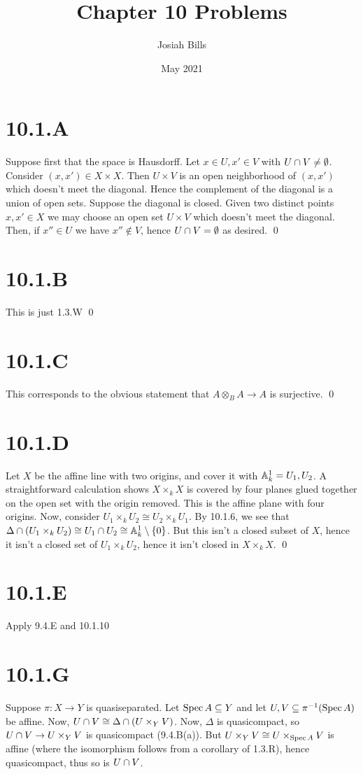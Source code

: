 \documentclass{article}
\title{Chapter 10 Problems}
\author{Josiah Bills}
\date{May 2021}
\begin{document}
\maketitle

\section{10.1.A}
Suppose first that the space is Hausdorff. Let $x \in U, x' \in V$ with
$U \cap V \neq \emptyset$. Consider $(x, x') \in X \times X$. Then
$U \times V$ is an open neighborhood of $(x, x')$ which
doesn't meet the diagonal. Hence the complement of the diagonal is a union of
open sets. Suppose the diagonal is closed. Given two distinct points
$x, x' \in X$ we may choose an open set $U \times V$ which
doesn't meet the diagonal. Then, if $x'' \in U$ we have
$x'' \notin V$, hence $U \cap V = \emptyset$ as desired. \qed

\section{10.1.B}
This is just 1.3.W \qed

\section{10.1.C}
This corresponds to the obvious statement that $A \otimes_B A \to A$ is
surjective. \qed

\section{10.1.D}
Let $X$ be the affine line with two origins, and cover it
with $\mathbb{A}^1_k=U_1, U_2$. A straightforward calculation shows
$X \times_k X$ is covered by four planes glued together on the open set
with the origin removed. This is the affine plane with four origins. Now,
consider $U_1 \times_k U_2 \cong U_2 \times_k U_1$. By 10.1.6, we see that $\Delta \cap (U_1 \times_k U_2) \cong U_1 \cap U_2 \cong \mathbb{A}^1_k \setminus
    \{0\}$.
But this isn't a closed subset of $X$, hence it isn't a
closed set of $U_1 \times_k U_2$, hence it isn't closed in
$X \times_k X$. \qed

\section{10.1.E}
Apply 9.4.E and 10.1.10

\section{10.1.G}
Suppose $\pi: X \to Y$ is quasiseparated. Let $\operatorname{Spec} A \subseteq Y$
and let $U, V \subseteq \pi^{-1}(\operatorname{Spec} A)$ be affine. Now, $U \cap V \cong \Delta \cap (U \times_Y V)$. Now,
$\Delta$ is quasicompact, so $U \cap V \to U \times_Y V$ is
quasicompact (9.4.B(a)). But $U \times_Y V \cong U \times_{\operatorname{Spec} A} V$ is affine (where the
isomorphism follows from a corollary of 1.3.R), hence quasicompact, thus so is
$U \cap V$.
\end{document}
